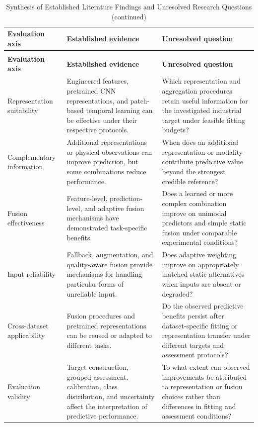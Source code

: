 \begingroup
\small
\begin{longtable}{@{}P{.19\textwidth}P{.36\textwidth}P{.39\textwidth}@{}}
\caption{Synthesis of Established Literature Findings and Unresolved Research Questions}
\label{tab:literature-synthesis}\\
\toprule
\textbf{Evaluation axis} & \textbf{Established evidence} & \textbf{Unresolved question} \\
\midrule
\endfirsthead
\caption[]{Synthesis of Established Literature Findings and Unresolved Research Questions (continued)}\\
\toprule
\textbf{Evaluation axis} & \textbf{Established evidence} & \textbf{Unresolved question} \\
\midrule
\endhead
\bottomrule
\endfoot
Representation suitability & Engineered features, pretrained CNN representations, and patch-based temporal learning can be effective under their respective protocols. & Which representation and aggregation procedures retain useful information for the investigated industrial target under feasible fitting budgets? \\[5pt]
Complementary information & Additional representations or physical observations can improve prediction, but some combinations reduce performance. & When does an additional representation or modality contribute predictive value beyond the strongest credible reference? \\[5pt]
Fusion effectiveness & Feature-level, prediction-level, and adaptive fusion mechanisms have demonstrated task-specific benefits. & Does a learned or more complex combination improve on unimodal predictors and simple static fusion under comparable experimental conditions? \\[5pt]
Input reliability & Fallback, augmentation, and quality-aware fusion provide mechanisms for handling particular forms of unreliable input. & Does adaptive weighting improve on appropriately matched static alternatives when inputs are absent or degraded? \\[5pt]
Cross-dataset applicability & Fusion procedures and pretrained representations can be reused or adapted to different tasks. & Do the observed predictive benefits persist after dataset-specific fitting or representation transfer under different targets and assessment protocols? \\[5pt]
Evaluation validity & Target construction, grouped assessment, calibration, class distribution, and uncertainty affect the interpretation of predictive performance. & To what extent can observed improvements be attributed to representation or fusion choices rather than differences in fitting and assessment conditions? \\[5pt]
\end{longtable}
\endgroup

